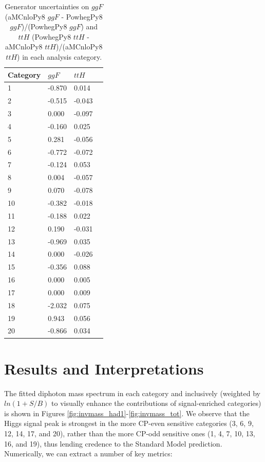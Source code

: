 \begin{table}[ht]
\begin{center}
\begin{tabular}{llll}
Category & $ggF$ & $ttH$ \\ \hline
\hline
1  &     -0.870 &      0.014 \\
2  &     -0.515 &     -0.043 \\
3  &      0.000 &     -0.097 \\
4  &     -0.160 &      0.025 \\
5  &      0.281 &     -0.056 \\
6  &     -0.772 &     -0.072 \\
7  &     -0.124 &      0.053 \\
8  &      0.004 &     -0.057 \\
9  &      0.070 &     -0.078 \\
10 &     -0.382 &     -0.018 \\
11 &     -0.188 &      0.022 \\
12 &      0.190 &     -0.031 \\ \hline
13 &     -0.969 &      0.035 \\
14 &      0.000 &     -0.026 \\
15 &     -0.356 &      0.088 \\
16 &      0.000 &      0.005 \\
17 &      0.000 &      0.009 \\
18 &     -2.032 &      0.075 \\
19 &      0.943 &      0.056 \\
20 &     -0.866 &      0.034 \\ \hline
\end{tabular}
\end{center}
\vspace{-0.5cm}
\caption{Generator uncertainties on $ggF$ (aMCnloPy8 $ggF$ - PowhegPy8 $ggF$)/(PowhegPy8 $ggF$) and $ttH$ (PowhegPy8 $ttH$ - aMCnloPy8 $ttH$)/(aMCnloPy8 $ttH$) in each analysis category. }
\label{tab:mcgen}
\end{table}

\section{Results and Interpretations}\label{sec:results}

The fitted diphoton mass spectrum in each category and inclusively (weighted by $ln(1+S/B)$ to visually enhance the contributions of signal-enriched categories) is shown in Figures \ref{fig:invmass_had1}-\ref{fig:invmass_tot}. We observe that the Higgs signal peak is strongest in the more CP-even sensitive categories (3, 6, 9, 12, 14, 17, and 20), rather than the more CP-odd sensitive ones (1, 4, 7, 10, 13, 16, and 19), thus lending credence to the Standard Model prediction. Numerically, we can extract a number of key metrics:

